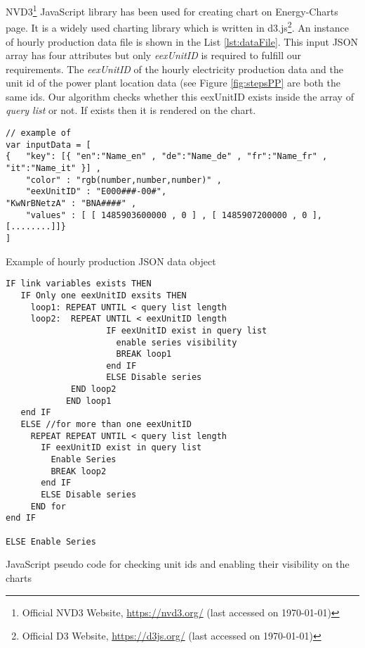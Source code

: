 NVD3\footnote{Official NVD3 Website, \url{https://nvd3.org/} (last accessed on \today)} JavaScript library has been used for creating chart on Energy-Charts page. It is a widely used charting library which is written in d3.js\footnote{Official D3 Website, \url{https://d3js.org/} (last accessed on \today)}. An instance of hourly production data file is shown in the List \ref{lst:dataFile}. This input JSON array has four attributes but only \textit{eexUnitID} is required to fulfill our requirements. The \textit{eexUnitID} of the hourly electricity production data and the unit id of the power plant location data (see Figure \ref{fig:stepsPP} are both the same ids. Our algorithm checks whether this eexUnitID exists inside the array of \textit{query list} or not. If exists then it is rendered on the chart. %

\begin{Listing} [H]
\begin{lstlisting}
// example of 
var inputData = [
{	"key": [{ "en":"Name_en" , "de":"Name_de" , "fr":"Name_fr" , "it":"Name_it" }] ,
	"color" : "rgb(number,number,number)" ,
	"eexUnitID" : "E000###-00#",
"KwNrBNetzA" : "BNA####" ,
	"values" : [ [ 1485903600000 , 0 ] , [ 1485907200000 , 0 ], [........]]}
]

\end{lstlisting}
\caption{Example of hourly production JSON data object}
\label{lst:dataFile}
\end{Listing}

\begin{Listing} [H]
\begin{lstlisting}
IF link variables exists THEN
   IF Only one eexUnitID exsits THEN
     loop1: REPEAT UNTIL < query list length
     loop2:  REPEAT UNTIL < eexUnitID length
					IF eexUnitID exist in query list
        	          enable series visibility 
                	  BREAK loop1
                	end IF
					ELSE Disable series
			 END loop2
		    END loop1
   end IF
   ELSE //for more than one eexUnitID
     REPEAT REPEAT UNTIL < query list length
       IF eexUnitID exist in query list
         Enable Series
         BREAK loop2
       end IF
       ELSE Disable series
     END for
end IF

ELSE Enable Series
\end{lstlisting}
\caption[pseudo code for checking unit ids]{JavaScript pseudo code for checking unit ids and enabling their visibility on the charts}
\label{lst:algo}
\end{Listing}

